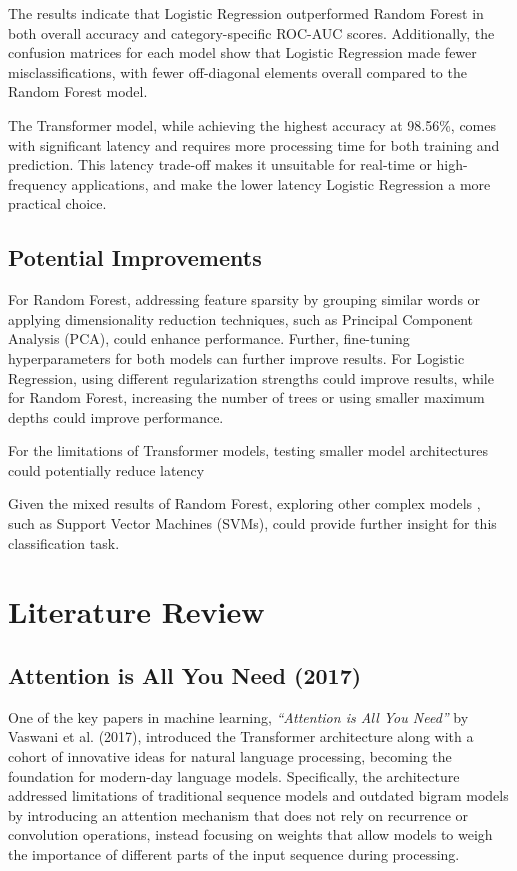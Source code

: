 \documentclass[12pt,letterpaper]{article}
\begin{document}
The results indicate that Logistic Regression outperformed Random Forest in both overall accuracy and category-specific ROC-AUC scores. Additionally, the confusion matrices for each model show that Logistic Regression made fewer misclassifications, with fewer off-diagonal elements overall compared to the Random Forest model.

The Transformer model, while achieving the highest accuracy at 98.56\%, comes with significant latency and requires more processing time for both training and prediction. This latency trade-off makes it unsuitable for real-time or high-frequency applications, and make the lower latency Logistic Regression a more practical choice.


\subsection{Potential Improvements}
For Random Forest, addressing feature sparsity by grouping similar words or applying dimensionality reduction techniques, such as Principal Component Analysis (PCA), could enhance performance. Further, fine-tuning hyperparameters for both models can further improve results. For Logistic Regression, using different regularization strengths could improve results, while for Random Forest, increasing the number of trees or using smaller maximum depths could improve performance.

For the limitations of Transformer models, testing smaller model architectures could potentially reduce latency

Given the mixed results of Random Forest, exploring other complex models , such as Support Vector Machines (SVMs), could provide further insight for this classification task.



\section{Literature Review}

\subsection{Attention is All You Need (2017)}

One of the key papers in machine learning, \textit{“Attention is All You Need”} by Vaswani et al. (2017), introduced the Transformer architecture along with a cohort of innovative ideas for natural language processing, becoming the foundation for modern-day language models. Specifically, the architecture addressed limitations of traditional sequence models and outdated bigram models by introducing an attention mechanism that does not rely on recurrence or convolution operations, instead focusing on weights that allow models to weigh the importance of different parts of the input sequence during processing.
\end{document}
